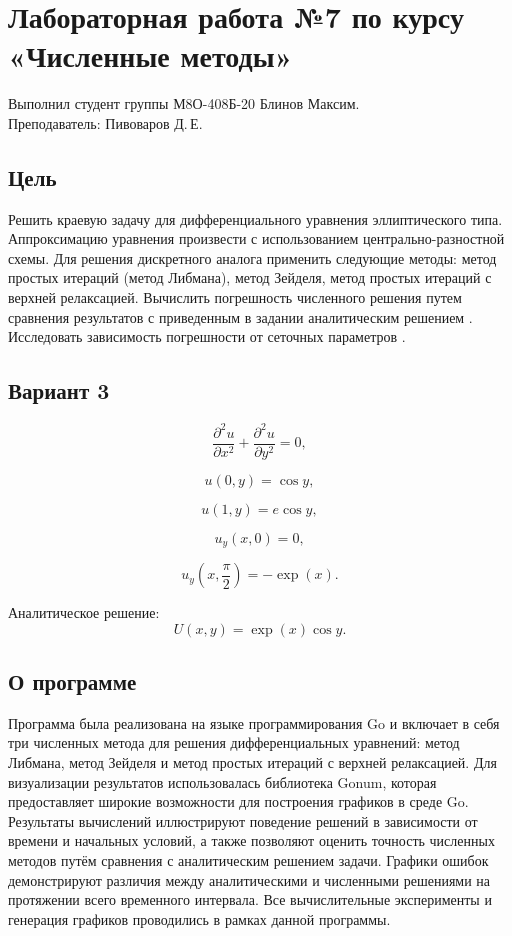 \documentclass{article}
\begin{document}
\section*{Лабораторная работа №7 по курсу «Численные методы»}

Выполнил студент группы М8О-408Б-20 Блинов Максим.
\\
Преподаватель: Пивоваров Д.\,Е.

\subsection*{Цель}

Решить краевую задачу для дифференциального уравнения эллиптического типа. 
Аппроксимацию уравнения произвести с использованием центрально-разностной схемы. 
Для решения дискретного аналога применить следующие методы: метод простых итераций (метод Либмана), 
метод Зейделя, метод простых итераций с верхней релаксацией. Вычислить погрешность численного решения 
путем сравнения результатов с приведенным в задании аналитическим решением . Исследовать зависимость 
погрешности от сеточных параметров .

\subsection*{Вариант 3}
$$
\frac{\partial^2 u}{\partial x^2} + \frac{\partial^2 u}{\partial y^2} = 0,
$$

$$
u(0, y) = \cos y,
$$

$$
u(1, y) = e \cos y,
$$

$$
u_y(x, 0) = 0,
$$

$$
u_y\left(x, \frac{\pi}{2}\right) = -\exp(x).
$$

Аналитическое решение:
$$
U(x, y) = \exp(x) \cos y.
$$




\subsection*{О программе}

Программа была реализована на языке программирования Go и включает в себя три численных метода для решения дифференциальных уравнений: 
метод Либмана, метод Зейделя и метод простых итераций с верхней релаксацией. Для визуализации результатов использовалась библиотека Gonum, 
которая предоставляет широкие возможности для построения графиков в среде Go. Результаты вычислений иллюстрируют поведение решений в зависимости от времени 
и начальных условий, а также позволяют оценить точность численных методов путём сравнения с аналитическим решением задачи. 
Графики ошибок демонстрируют различия между аналитическими и численными решениями на протяжении всего временного интервала. 
Все вычислительные эксперименты и генерация графиков проводились в рамках данной программы.
\end{document}
